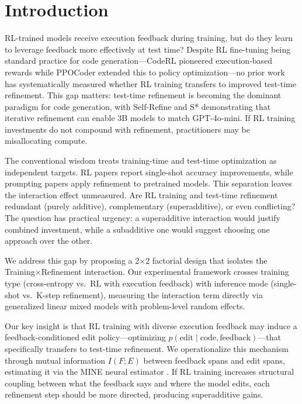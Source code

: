 \section{Introduction}
\label{sec:introduction}

RL-trained models receive execution feedback during training, but do they learn to leverage feedback more effectively at test time? Despite RL fine-tuning being standard practice for code generation---CodeRL \citep{le2022coderl} pioneered execution-based rewards while PPOCoder \citep{shojaee2023ppocoder} extended this to policy optimization---no prior work has systematically measured whether RL training transfers to improved test-time refinement. This gap matters: test-time refinement is becoming the dominant paradigm for code generation, with Self-Refine \citep{madaan2023selfrefine} and S* \citep{li2025sstar} demonstrating that iterative refinement can enable 3B models to match GPT-4o-mini. If RL training investments do not compound with refinement, practitioners may be misallocating compute.

The conventional wisdom treats training-time and test-time optimization as independent targets. RL papers report single-shot accuracy improvements, while prompting papers apply refinement to pretrained models. This separation leaves the interaction effect unmeasured. Are RL training and test-time refinement redundant (purely additive), complementary (superadditive), or even conflicting? The question has practical urgency: a superadditive interaction would justify combined investment, while a subadditive one would suggest choosing one approach over the other.

We address this gap by proposing a 2$\times$2 factorial design that isolates the Training$\times$Refinement interaction. Our experimental framework crosses training type (cross-entropy vs.\ RL with execution feedback) with inference mode (single-shot vs.\ K-step refinement), measuring the interaction term directly via generalized linear mixed models with problem-level random effects.

Our key insight is that RL training with diverse execution feedback may induce a feedback-conditioned edit policy---optimizing $p(\text{edit} \mid \text{code}, \text{feedback})$---that specifically transfers to test-time refinement. We operationalize this mechanism through mutual information $I(F;E)$ between feedback spans and edit spans, estimating it via the MINE neural estimator \citep{belghazi2018mine}. If RL training increases structural coupling between what the feedback says and where the model edits, each refinement step should be more directed, producing superadditive gains.

